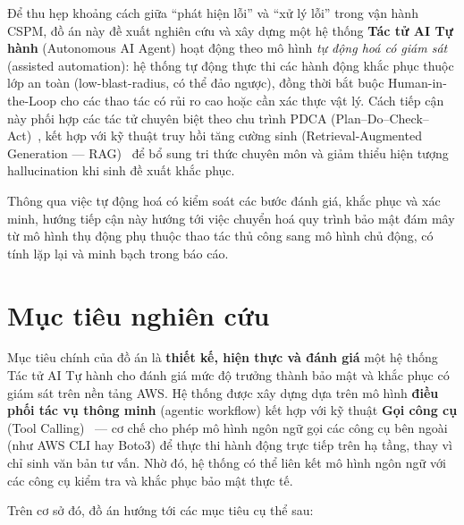 Để thu hẹp khoảng cách giữa ``phát hiện lỗi'' và ``xử lý lỗi'' trong vận hành CSPM, đồ án này đề xuất nghiên cứu và xây dựng một hệ thống \textbf{Tác tử AI Tự hành} (Autonomous AI Agent) hoạt động theo mô hình \textit{tự động hoá có giám sát} (assisted automation): hệ thống tự động thực thi các hành động khắc phục thuộc lớp an toàn (low-blast-radius, có thể đảo ngược), đồng thời bắt buộc Human-in-the-Loop cho các thao tác có rủi ro cao hoặc cần xác thực vật lý. Cách tiếp cận này phối hợp các tác tử chuyên biệt theo chu trình PDCA (Plan--Do--Check--Act)~\cite{deming1986pdca}, kết hợp với kỹ thuật truy hồi tăng cường sinh (Retrieval-Augmented Generation --- RAG)~\cite{lewis2020rag} để bổ sung tri thức chuyên môn và giảm thiểu hiện tượng hallucination khi sinh đề xuất khắc phục.

Thông qua việc tự động hoá có kiểm soát các bước đánh giá, khắc phục và xác minh, hướng tiếp cận này hướng tới việc chuyển hoá quy trình bảo mật đám mây từ mô hình thụ động phụ thuộc thao tác thủ công sang mô hình chủ động, có tính lặp lại và minh bạch trong báo cáo.


\section{Mục tiêu nghiên cứu}

Mục tiêu chính của đồ án là \textbf{thiết kế, hiện thực và đánh giá} một hệ thống Tác tử AI Tự hành cho đánh giá mức độ trưởng thành bảo mật và khắc phục có giám sát trên nền tảng AWS. Hệ thống được xây dựng dựa trên mô hình \textbf{điều phối tác vụ thông minh} (agentic workflow) kết hợp với kỹ thuật \textbf{Gọi công cụ} (Tool Calling)~\cite{schick2023toolformer,yao2023react} --- cơ chế cho phép mô hình ngôn ngữ gọi các công cụ bên ngoài (như AWS CLI hay Boto3) để thực thi hành động trực tiếp trên hạ tầng, thay vì chỉ sinh văn bản tư vấn. Nhờ đó, hệ thống có thể liên kết mô hình ngôn ngữ với các công cụ kiểm tra và khắc phục bảo mật thực tế.

Trên cơ sở đó, đồ án hướng tới các mục tiêu cụ thể sau:

